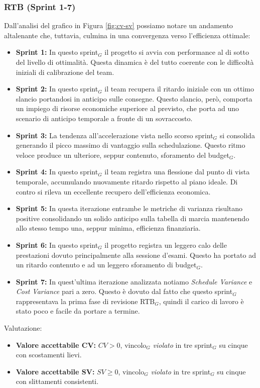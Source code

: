\documentclass[a4paper, 10pt, colorlinks=true, linkcolor=black, urlcolor=blue, citecolor=blue, hidelinks]{article}
\begin{document}
\subsubsection{RTB (Sprint 1-7)}
Dall'analisi del grafico in Figura \ref{fig:cv-sv} possiamo notare un andamento altalenante che, tuttavia, culmina in una convergenza verso l'efficienza ottimale:
\begin{itemize}
    \item \textbf{Sprint 1:} In questo sprint$_G$ il progetto si avvia con performance al di sotto del livello di ottimalità. Questa dinamica è del tutto coerente con le difficoltà iniziali di calibrazione del team.
    \item \textbf{Sprint 2:} In questo sprint$_G$ il team recupera il ritardo iniziale con un ottimo slancio portandosi in anticipo sulle consegne. Questo slancio, però, comporta un impiego di risorse economiche superiore al previsto, che porta ad uno scenario di anticipo temporale a fronte di un sovraccosto.
    \item \textbf{Sprint 3:} La tendenza all'accelerazione vista nello scorso sprint$_G$ si consolida generando il picco massimo di vantaggio sulla schedulazione. Questo ritmo veloce produce un ulteriore, seppur contenuto, sforamento del budget$_G$.
    \item \textbf{Sprint 4:} In questo sprint$_G$ il team registra una flessione dal punto di vista temporale, accumulando nuovamente ritardo rispetto al piano ideale. Di contro si rileva un eccellente recupero dell'efficienza economica.
    \item \textbf{Sprint 5:} In questa iterazione entrambe le metriche di varianza risultano positive consolidando un solido anticipo sulla tabella di marcia mantenendo allo stesso tempo una, seppur minima, efficienza finanziaria.
    \item \textbf{Sprint 6:} In questo sprint$_G$ il progetto registra un leggero calo delle prestazioni dovuto principalmente alla sessione d'esami. Questo ha portato ad un ritardo contenuto e ad un leggero sforamento di budget$_G$.
    \item \textbf{Sprint 7:} In quest'ultima iterazione analizzata notiamo \textit{Schedule Variance} e \textit{Cost Variance} pari a zero. Questo è dovuto dal fatto che questo sprint$_G$ rappresentava la prima fase di revisione RTB$_G$, quindi il carico di lavoro è stato poco e facile da portare a termine. 
\end{itemize}
Valutazione: 
\begin{itemize}
    \item \textbf{Valore accettabile CV:} $CV>0$, vincolo$_G$ \textit{violato} in tre sprint$_G$ su cinque con scostamenti lievi.
    \item \textbf{Valore accettabile SV:} $SV\geq 0$, vincolo$_G$ \textit{violato} in tre sprint$_G$ su cinque con slittamenti consistenti.
\end{itemize}
\end{document}
